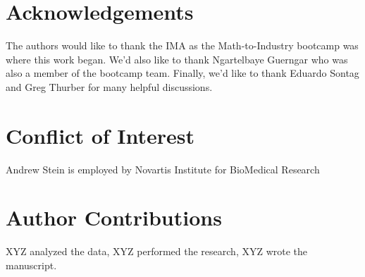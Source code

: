 \documentclass{article}
\begin{document}
\section*{Acknowledgements}
The authors would like to thank the IMA as the Math-to-Industry bootcamp was where this work began.  We'd also like to thank Ngartelbaye Guerngar who was also a member of the bootcamp team.  Finally, we'd like to thank Eduardo Sontag and Greg Thurber for many helpful discussions.

\section*{Conflict of Interest}
Andrew Stein is employed by Novartis Institute for BioMedical Research

\section*{Author Contributions}
XYZ analyzed the data, XYZ performed the research, XYZ wrote the manuscript.

 



\end{document}
